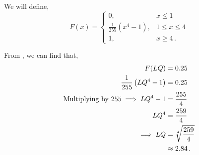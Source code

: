 \begin{subquestions}
\begin{subsubquestions}
We will define,
\[ F(x) = \begin{cases} 
	0 , & x\leq 1 \\
	\frac{1}{255}\left(x^4 - 1 \right), & 1 \leq x \leq 4 \\
	1, & x \geq 4 \,.
\end{cases}
\]


\subsubquestion

From , we can find that,
\begin{align}
	F(LQ) & = 0.25 \nonumber \\
	\frac{1}{255}\left(LQ^4 - 1 \right) & = 0.25 \nonumber \\
	\text{Multiplying by 255} \implies LQ^4 - 1 & = \frac{255}{4} \nonumber \\
	LQ^4 & = \frac{259}{4} \nonumber \\
	\implies LQ & = \sqrt[4]{\frac{259}{4}} \nonumber \\
	           & \approx 2.84 \,. 
\end{align}	

\end{subsubquestions}
	
\end{subquestions}
